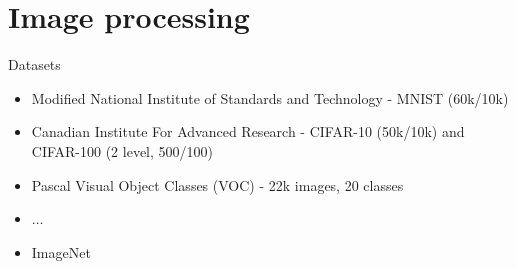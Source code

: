 \section{Image processing}

\begin{frame}{Datasets} 
	\begin{itemize}
		\item Modified National Institute of Standards and Technology - MNIST (60k/10k)
		\item Canadian Institute For Advanced Research -  CIFAR-10 (50k/10k) and CIFAR-100 (2 level, 500/100) 
		\item Pascal Visual Object Classes (VOC) - 22k images, 20 classes
		\item $\dots$ 
		\item ImageNet 
	\end{itemize}
\end{frame}

